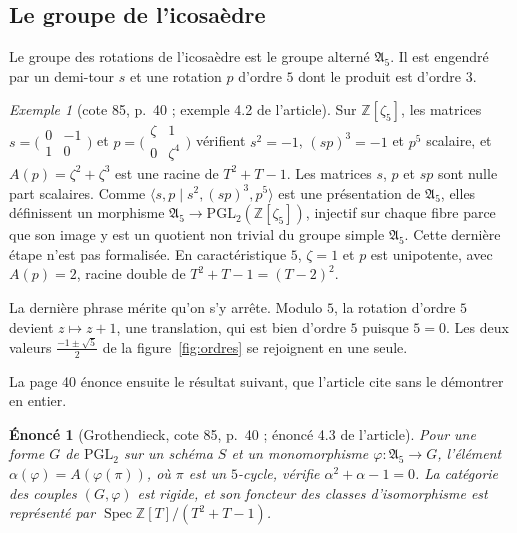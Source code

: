 \documentclass[11pt,a4paper]{amsart}
\theoremstyle{definition}
\theoremstyle{plain}
\theoremstyle{remark}
\newtheorem{exemple}{Exemple}
\theoremstyle{plain}
\newtheorem*{enonce}{Énoncé}
\newcommand{\Z}{\mathbb Z}
\newcommand{\PGL}{\mathrm{PGL}_2}
\newcommand{\Spec}{\operatorname{Spec}}
\begin{document}
\subsection{Le groupe de l'icosaèdre}

Le groupe des rotations de l'icosaèdre est le groupe alterné $\mathfrak A_5$. Il est engendré par un demi-tour $s$ et une rotation $p$ d'ordre $5$ dont le produit est d'ordre $3$.

\begin{exemple}[cote 85, p.~40 ; exemple 4.2 de l'article]
Sur $\Z[\zeta_5]$, les matrices $s = \bigl(\begin{smallmatrix} 0 & -1 \\ 1 & 0\end{smallmatrix}\bigr)$ et $p = \bigl(\begin{smallmatrix} \zeta & 1 \\ 0 & \zeta^4\end{smallmatrix}\bigr)$ vérifient $s^2 = -1$, $(sp)^3 = -1$ et $p^5$ scalaire, et $A(p) = \zeta^2 + \zeta^3$ est une racine de $T^2 + T - 1$. Les matrices $s$, $p$ et $sp$ sont nulle part scalaires. Comme $\langle s, p \mid s^2, (sp)^3, p^5\rangle$ est une présentation de $\mathfrak A_5$, elles définissent un morphisme $\mathfrak A_5 \to \PGL(\Z[\zeta_5])$, injectif sur chaque fibre parce que son image y est un quotient non trivial du groupe simple $\mathfrak A_5$. Cette dernière étape n'est pas formalisée. En caractéristique $5$, $\zeta = 1$ et $p$ est unipotente, avec $A(p) = 2$, racine double de $T^2 + T - 1 = (T - 2)^2$.
\end{exemple}

La dernière phrase mérite qu'on s'y arrête. Modulo $5$, la rotation d'ordre $5$ devient $z \mapsto z + 1$, une translation, qui est bien d'ordre $5$ puisque $5 = 0$. Les deux valeurs $\frac{-1\pm\sqrt5}{2}$ de la figure~\ref{fig:ordres} se rejoignent en une seule.

La page 40 énonce ensuite le résultat suivant, que l'article cite sans le démontrer en entier.

\begin{enonce}[Grothendieck, cote 85, p.~40 ; énoncé 4.3 de l'article]
Pour une forme $G$ de $\PGL$ sur un schéma $S$ et un monomorphisme $\varphi \colon \mathfrak A_5 \to G$, l'élément $\alpha(\varphi) = A(\varphi(\pi))$, où $\pi$ est un $5$-cycle, vérifie $\alpha^2 + \alpha - 1 = 0$. La catégorie des couples $(G, \varphi)$ est rigide, et son foncteur des classes d'isomorphisme est représenté par $\Spec\Z[T]/(T^2 + T - 1)$.
\end{enonce}
\end{document}

